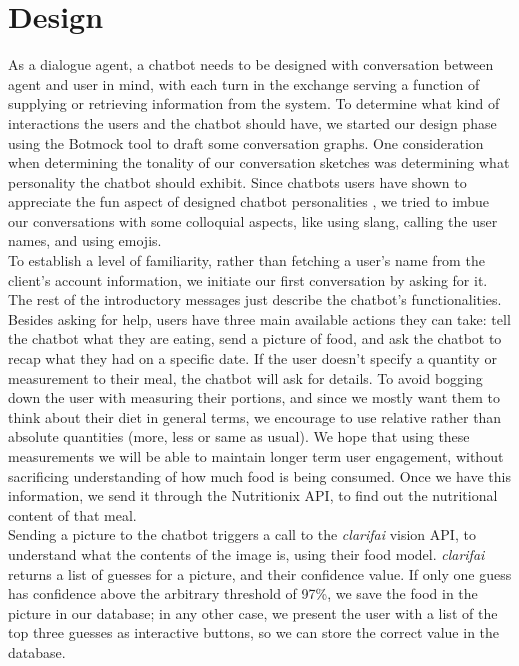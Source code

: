 \section{Design}
As a dialogue agent, a chatbot needs to be designed with conversation between agent and user in mind, with each turn in the exchange serving a function of supplying or retrieving information from the system.
To determine what kind of interactions the users and the chatbot should have, we started our design phase using the Botmock tool to draft some conversation graphs.
One consideration when determining the tonality of our conversation sketches was determining what personality the chatbot should exhibit. Since chatbots users have shown to appreciate the fun aspect of designed chatbot personalities \cite{10.1007/978-3-319-67744-6_28}, we tried to imbue our conversations with some colloquial aspects, like using slang, calling the user names, and using emojis. \\
To establish a level of familiarity, rather than fetching a user's name from the client's account information, we initiate our first conversation by asking for it. The rest of the introductory messages just describe the chatbot's functionalities.
Besides asking for help, users have three main available actions they can take: tell the chatbot what they are eating, send a picture of food, and ask the chatbot to recap what they had on a specific date. If the user doesn't specify a quantity or measurement to their meal, the chatbot will ask for details. To avoid bogging down the user with measuring their portions, and since we mostly want them to think about their diet in general terms, we encourage to use relative rather than absolute quantities (more, less or same as usual). We hope that using these measurements we will be able to maintain longer term user engagement, without sacrificing understanding of how much food is being consumed. Once we have this information, we send it through the Nutritionix API, to find out the nutritional content of that meal. \\
Sending a picture to the chatbot triggers a call to the \textit{clarifai} vision API, to understand what the contents of the image is, using their food model. \textit{clarifai} returns a list of guesses for a picture, and their confidence value. If only one guess has confidence above the arbitrary threshold of 97\%, we save the food in the picture in our database; in any other case, we present the user with a list of the top three guesses as interactive buttons, so we can store the correct value in the database. \\

